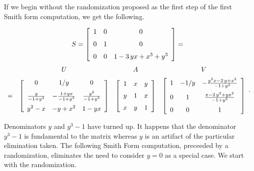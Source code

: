 \documentclass[10pt]{article}
\begin{document}
If we begin without the randomization proposed as the first step of the first Smith form
computation, we get the following.


\[
S =  
\left [\begin {array}{ccc} 
1&0&0 \\\noalign{\medskip}
0&1&0 \\\noalign{\medskip}
0&0&1-3\,yx+{x}^{3}+{y}^{3}\end {array}\right ] 
= 
\]\[
\begin{array}{cccc}
~ & U & A & V\\\noalign{\medskip}
= &
\left [\begin {array}{ccc} 
0&1/y&0\\\noalign{\medskip}
{\frac {y}{-1+{y}^{3}}}&-{\frac {1+yx}{-1+{y}^{3}}}&{\frac {{y}^{2}}{-1+{y}^{3}}}\\\noalign{\medskip}
{y}^{2}-x&-y+{x}^{2}&1-yx\end {array}\right ]
&
\left [\begin {array}{ccc} 
1&x&y\\\noalign{\medskip}
y&1&x\\\noalign{\medskip}
x&y&1\end {array}\right ]
&
\left [\begin {array}{ccc} 1&-1/y&-{\frac {{y}^{2}x-2\,y+{x}^{2}}{
-1+{y}^{3}}}\\\noalign{\medskip}0&1&{\frac {x-2\,{y}^{2}+y{x}^{2}}{-1+{
y}^{3}}}\\\noalign{\medskip}0&0&1\end {array}\right ]
\end{array}.
\]

Denominators $y$ and $y^3 - 1$ have turned up.  It happens that the denominator $y^3 - 1$ is 
fundamental to the matrix whereas $y$ is an artifact of the particular elimination taken.
The following Smith Form computation, preceeded by a randomization, eliminates the need
to consider $y = 0$ as a special case. We start with the randomization.
\end{document}
